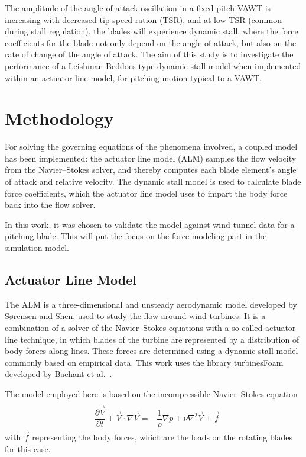 \documentclass[a4paper]{jpconf}
\begin{document}
The amplitude of the angle of attack oscillation in a fixed pitch VAWT is
increasing with decreased tip speed ration (TSR), and at low TSR (common during
stall regulation), the blades will experience dynamic stall, where the force
coefficients for the blade not only depend on the angle of attack, but also on
the rate of change of the angle of attack. The aim of this study is to
investigate the performance of a Leishman-Beddoes type dynamic stall model when
implemented within an actuator line model, for pitching motion typical to a
VAWT.


\section{Methodology}

For solving the governing equations of the phenomena involved, a coupled model
has been implemented: the actuator line model (ALM) samples the flow velocity
from the Navier--Stokes solver, and thereby computes each blade element's angle
of attack and relative velocity. The dynamic stall model is used to calculate
blade force coefficients, which the actuator line model uses to impart the body
force back into the flow solver.

In this work, it was chosen to validate the model against wind tunnel data for a
pitching blade. This will put the focus on the force modeling part in the
simulation model.

\subsection{Actuator Line Model}

The ALM is a three-dimensional and unsteady aerodynamic model developed by
S{\o}rensen and Shen\cite{sorensen1999computation}, used to study the flow
around wind turbines. It is a combination of a solver of the Navier--Stokes equations
with a so-called actuator line technique, in which blades of the turbine are
represented by a distribution of body forces along lines. These forces
are determined using a dynamic stall model commonly based on empirical data.
This work uses the library turbinesFoam developed by Bachant et
al.~\cite{bachant2015simulating,Bachant2016-VAT-ALM,turbinesFoam-v0.0.7}.

The model employed here is based on the incompressible Navier--Stokes equation
\begin{align}
 & \nonumber \\ & \dfrac{\partial \vec{V}}{\partial t} + \vec{V} \cdot \nabla \vec{V} = - \dfrac{1}{ \rho} \nabla p + \nu \nabla ^2 \vec{V} + \vec{f}	  \label{eqmom}
\end{align} %
with $\vec{f}$ representing the body forces, which are the loads on the rotating blades for this case.
\end{document}
